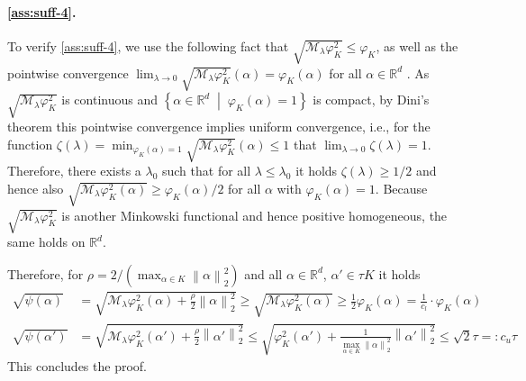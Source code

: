 \documentclass[a4paper]{article}
\newcommand{\mathset}[1]{\left\{#1\right\}}
\newcommand{\norm}[1]{\left\|#1\right\|}
\newcommand{\setmid}[0]{\;\middle|\;}
\newcommand{\RR}[0]{\mathbb{R}}
\newcommand{\cM}[0]{\mathcal{M}}
\theoremstyle{thmstyle}
\theoremstyle{defstyle}
\theoremstyle{remark}
\begin{document}
    \paragraph{\ref{ass:suff-4}.} To verify \ref{ass:suff-4}, we use the following fact that $\sqrt{\cM_\lambda \varphi_K^2} \leq \varphi_K$, as well as the pointwise convergence $\lim_{\lambda\to 0} \sqrt{\cM_\lambda \varphi_K^2}(\alpha) = \varphi_K(\alpha)$ for all $\alpha\in\RR^d$ \citep[Theorem 5.6]{Planiden2019proximal}. As $\sqrt{\cM_\lambda \varphi_K^2}$ is continuous and $\mathset{\alpha\in\RR^d \setmid \varphi_K(\alpha)=1}$ is compact, by Dini's theorem this pointwise convergence implies uniform convergence, i.e., for the function $\zeta(\lambda)=\min_{\varphi_K(\alpha)=1}\sqrt{\cM_\lambda \varphi_K^2}(\alpha)\leq 1$ that $\lim_{\lambda\to 0}\zeta(\lambda)=1$. Therefore, there exists a $\lambda_0$ such that for all $\lambda \leq \lambda_0$ it holds $\zeta(\lambda)\geq 1/2$ and hence also $\sqrt{\cM_\lambda \varphi_K^2(\alpha)}\geq \varphi_K(\alpha)/2$ for all $\alpha$ with $\varphi_K(\alpha)=1$. Because $\sqrt{\cM_\lambda \varphi_K^2}$ is another Minkowski functional  \citep[Theorem 5.6]{Planiden2019proximal} and hence positive homogeneous, the same holds on $\RR^d$. 
        
         
        Therefore, for $\rho=2/(\max_{\alpha\in K}\norm{\alpha}_2^2)$ and all $\alpha\in \RR^d$, $\alpha'\in \tau K$ it holds
        \begin{align*}
            \sqrt{\psi(\alpha)}&=\sqrt{\cM_{\lambda} \varphi_K^2(\alpha) + \frac{\rho}{2}\norm{\alpha}_2^2} \geq \sqrt{\cM_{\lambda} \varphi_K^2(\alpha)} \geq \frac{1}{2}\varphi_K(\alpha) = \frac{1}{c_l}\cdot \varphi_K(\alpha) \\
            \sqrt{\psi(\alpha')}&=\sqrt{\cM_{\lambda} \varphi_K^2(\alpha') + \frac{\rho}{2}\norm{\alpha'}_2^2} \leq \sqrt{\varphi_K^2(\alpha')+\frac{1}{\max_{\alpha\in K}\norm{\alpha}_2^2}\norm{\alpha'}_2^2} \leq \sqrt{2}\tau =: c_u \tau
        \end{align*}
    This concludes the proof.
\end{document}
